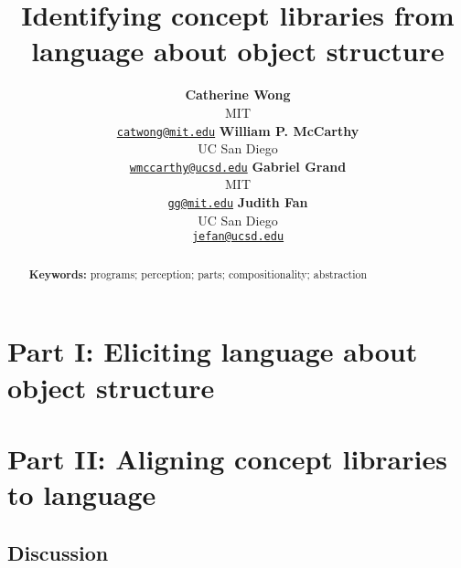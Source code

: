 \documentclass[10pt,letterpaper]{article}
\title{Identifying concept libraries from language about object structure}
\author{
\textbf{Catherine Wong} \\ MIT \\ \texttt{\href{mailto:catwong@mit.edu}{\url{catwong@mit.edu}}}
 \And
\textbf{William P. McCarthy} \\  UC San Diego \\ \texttt{\href{mailto:wmccarthy@ucsd.edu}{\url{wmccarthy@ucsd.edu}}}
 \And
\textbf{Gabriel Grand} \\ MIT \\ \texttt{\href{mailto:gg@mit.edu}{\url{gg@mit.edu}}}
 \And
\textbf{Judith Fan} \\ UC San Diego \\ \texttt{\href{mailto:jefan@ucsd.edu}{\url{jefan@ucsd.edu}}}
}
\begin{document}
\maketitle

\begin{abstract} 

\textbf{Keywords:} programs; perception; parts; compositionality; abstraction
\end{abstract}




\section{Part I: Eliciting language about \\ object structure} \label{sec-part-i}


\section{Part II: Aligning concept libraries \\ to language}\label{sec-part-ii}



\subsection{Discussion}




\setlength{\bibleftmargin}{.125in}
\setlength{\bibindent}{-\bibleftmargin}


\end{document}
